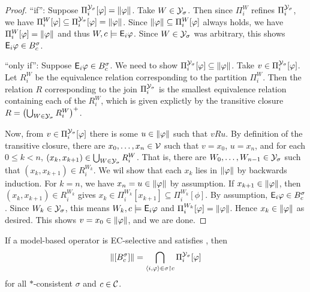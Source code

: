 \begin{proof}
    ``if'': Suppose $\Pi^{\mathcal{Y}_\sigma}_i[\varphi] = \|{\varphi}\|$. Take $W \in
    \mathcal{Y}_\sigma$. Then since $\Pi^W_i$ refines $\Pi^{\mathcal{Y}_\sigma}_i$, we have
    $\Pi^W_i[\varphi] \subseteq \Pi^{\mathcal{Y}_\sigma}_i[\varphi] = \|{\varphi}\|$. Since
    $\|{\varphi}\| \subseteq \Pi^W_i[\varphi]$ always holds, we have
    $\Pi^W_i[\varphi] = \|{\varphi}\|$ and thus $W, c \models \mathsf{E}_i\varphi$. Since
    $W \in \mathcal{Y}_\sigma$ was arbitrary, this shows $\mathsf{E}_i\varphi \in B^\sigma_c$.

    ``only if'': Suppose $\mathsf{E}_i\varphi \in B^\sigma_c$. We need to show
    $\Pi^{\mathcal{Y}_\sigma}_i[\varphi] \subseteq \|{\varphi}\|$. Take $v \in
    \Pi^{\mathcal{Y}_\sigma}_i[\varphi]$. Let $R^W_i$ be the equivalence relation
    corresponding to the partition $\Pi^W_i$. Then the relation $R$
    corresponding to the join $\Pi^{\mathcal{Y}_\sigma}_i$ is the smallest equivalence
    relation containing each of the $R^W_i$, which is given explictly by the
    transitive closure $R = \left(\bigcup_{W \in
    \mathcal{Y}_\sigma}{R^W_i}\right)^+$.

    Now, from $v \in \Pi^{\mathcal{Y}_\sigma}_i[\varphi]$ there is some $u \in
    \|{\varphi}\|$ such that $vRu$. By definition of the transitive closure,
    there are $x_0, \ldots, x_n \in \mathcal{V}$ such that $v = x_0$, $u = x_n$, and
    for each $0 \le k < n$, $(x_k, x_{k + 1}) \in \bigcup_{W \in
    \mathcal{Y}_\sigma}{R^W_i}$. That is, there are $W_0, \ldots, W_{n - 1} \in
    \mathcal{Y}_\sigma$ such that $(x_k, x_{k + 1}) \in R^{W_k}_i$.
    We wil show that each $x_k$ lies in $\|{\varphi}\|$ by backwards
    induction. For $k = n$, we have $x_n = u \in \|{\varphi}\|$ by
    assumption. If $x_{k + 1} \in \|{\varphi}\|$, then $(x_k, x_{k + 1}) \in
    R^{W_k}_i$ gives $x_k \in \Pi^{W_k}_i[x_{k + 1}] \subseteq
    \Pi^{W_k}_i[\phi]$. By assumption, $\mathsf{E}_i\varphi \in B^\sigma_c$. Since $W_k
    \in \mathcal{Y}_\sigma$, this means $W_k, c \models \mathsf{E}_i\varphi$ and $\Pi^{W_k}_i[\varphi]
    = \|{\varphi}\|$.  Hence $x_k \in \|{\varphi}\|$ as desired.
    This shows $v = x_0 \in \|{\varphi}\|$, and we are done.  \end{proof}

\begin{proposition}
    \label{kr_prop_ec_selective_propmodels}
    If a model-based operator is EC-selective and satisfies \soundness{}, then
    \[
        \|{\left[{B^\sigma_c}\right]}\|
        =
        \bigcap_{\langle {i, \varphi} \rangle \in \sigma \upharpoonright c}{
            \Pi^{\mathcal{Y}_\sigma}_i[\varphi]
        }
    \]
    for all $\ast$-consistent $\sigma$ and $c \in \mathcal{C}$.
\end{proposition}

